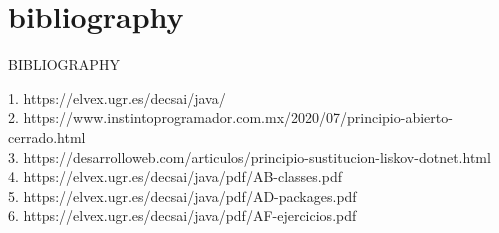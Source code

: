 \documentclass[11pt]{beamer}
\begin{document}


\section{bibliography}
\begin{frame}
BIBLIOGRAPHY

1. https://elvex.ugr.es/decsai/java/\\
2. https://www.instintoprogramador.com.mx/2020/07/principio-abierto-cerrado.html\\
3. https://desarrolloweb.com/articulos/principio-sustitucion-liskov-dotnet.html\\
4. https://elvex.ugr.es/decsai/java/pdf/AB-classes.pdf\\
5. https://elvex.ugr.es/decsai/java/pdf/AD-packages.pdf\\
6. https://elvex.ugr.es/decsai/java/pdf/AF-ejercicios.pdf\\
\end{frame}
\end{document}
